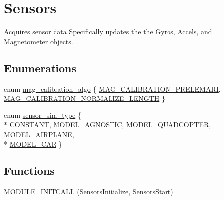 \hypertarget{group___sensors}{\section{Sensors}
\label{group___sensors}
}


Acquires sensor data Specifically updates the the Gyros, Accels, and Magnetometer objects.  


\subsection*{Enumerations}
\begin{DoxyCompactItemize}
\item 
enum \hyperlink{group___sensors_gaa4a9d2444da0ad9373dc8d8fc3d851c8}{mag\-\_\-calibration\-\_\-algo} \{ \hyperlink{group___sensors_ggaa4a9d2444da0ad9373dc8d8fc3d851c8acb8ba365d61808f93588f4f6ab773121}{M\-A\-G\-\_\-\-C\-A\-L\-I\-B\-R\-A\-T\-I\-O\-N\-\_\-\-P\-R\-E\-L\-E\-M\-A\-R\-I}, 
\hyperlink{group___sensors_ggaa4a9d2444da0ad9373dc8d8fc3d851c8a566b052171d9d352158b7d7652b4280a}{M\-A\-G\-\_\-\-C\-A\-L\-I\-B\-R\-A\-T\-I\-O\-N\-\_\-\-N\-O\-R\-M\-A\-L\-I\-Z\-E\-\_\-\-L\-E\-N\-G\-T\-H}
 \}
\item 
enum \hyperlink{group___sensors_ga6423b17c1c5cfe30ec2b9cabedc03f70}{sensor\-\_\-sim\-\_\-type} \{ \\*
\hyperlink{group___sensors_gga6423b17c1c5cfe30ec2b9cabedc03f70a83972670b57415508523b5641bb46116}{C\-O\-N\-S\-T\-A\-N\-T}, 
\hyperlink{group___sensors_gga6423b17c1c5cfe30ec2b9cabedc03f70a7960fc19ecff58403fe8ce9aff5254a8}{M\-O\-D\-E\-L\-\_\-\-A\-G\-N\-O\-S\-T\-I\-C}, 
\hyperlink{group___sensors_gga6423b17c1c5cfe30ec2b9cabedc03f70af0e5a574aa71ec14e1b4d7288086995c}{M\-O\-D\-E\-L\-\_\-\-Q\-U\-A\-D\-C\-O\-P\-T\-E\-R}, 
\hyperlink{group___sensors_gga6423b17c1c5cfe30ec2b9cabedc03f70a760a21ed021ec46ff7bbff4846bc7064}{M\-O\-D\-E\-L\-\_\-\-A\-I\-R\-P\-L\-A\-N\-E}, 
\\*
\hyperlink{group___sensors_gga6423b17c1c5cfe30ec2b9cabedc03f70ab7b5347f7118bc133ff0b6dddd3b0cf4}{M\-O\-D\-E\-L\-\_\-\-C\-A\-R}
 \}
\end{DoxyCompactItemize}
\subsection*{Functions}
\begin{DoxyCompactItemize}
\item 
\hyperlink{group___sensors_gad752fb91759736ace8a33f3994a6ddbc}{M\-O\-D\-U\-L\-E\-\_\-\-I\-N\-I\-T\-C\-A\-L\-L} (Sensors\-Initialize, Sensors\-Start)
\end{DoxyCompactItemize}
